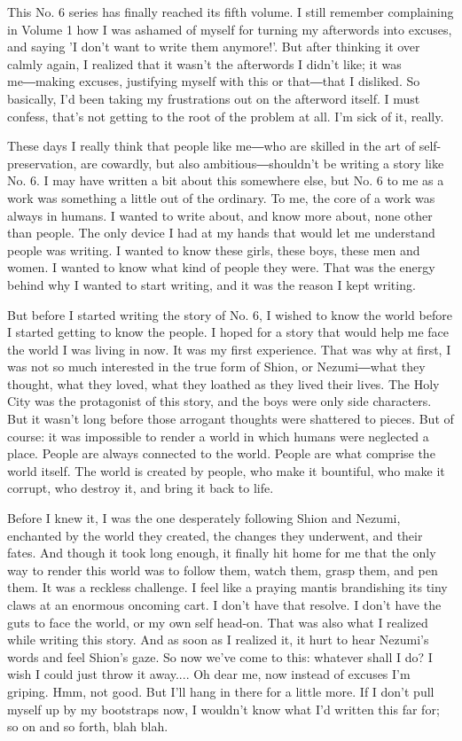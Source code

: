 This No. 6 series has finally reached its fifth volume. I still remember
complaining in Volume 1 how I was ashamed of myself for turning my
afterwords into excuses, and saying 'I don't want to write them
anymore!'. But after thinking it over calmly again, I realized that it
wasn't the afterwords I didn't like; it was me―making excuses,
justifying myself with this or that―that I disliked. So basically, I'd
been taking my frustrations out on the afterword itself. I must confess,
that's not getting to the root of the problem at all. I'm sick of it,
really.

These days I really think that people like me―who are skilled in the art
of self-preservation, are cowardly, but also ambitious―shouldn't be
writing a story like No. 6. I may have written a bit about this
somewhere else, but No. 6 to me as a work was something a little out of
the ordinary. To me, the core of a work was always in humans. I wanted
to write about, and know more about, none other than people. The only
device I had at my hands that would let me understand people was
writing. I wanted to know these girls, these boys, these men and women.
I wanted to know what kind of people they were. That was the energy
behind why I wanted to start writing, and it was the reason I kept
writing.

But before I started writing the story of No. 6, I wished to know the
world before I started getting to know the people. I hoped for a story
that would help me face the world I was living in now. It was my first
experience. That was why at first, I was not so much interested in the
true form of Shion, or Nezumi―what they thought, what they loved, what
they loathed as they lived their lives. The Holy City was the
protagonist of this story, and the boys were only side characters. But
it wasn't long before those arrogant thoughts were shattered to pieces.
But of course: it was impossible to render a world in which humans were
neglected a place. People are always connected to the world. People are
what comprise the world itself. The world is created by people, who make
it bountiful, who make it corrupt, who destroy it, and bring it back to
life.

Before I knew it, I was the one desperately following Shion and Nezumi,
enchanted by the world they created, the changes they underwent, and
their fates. And though it took long enough, it finally hit home for me
that the only way to render this world was to follow them, watch them,
grasp them, and pen them. It was a reckless challenge. I feel like a
praying mantis brandishing its tiny claws at an enormous oncoming cart.
I don't have that resolve. I don't have the guts to face the world, or
my own self head-on. That was also what I realized while writing this
story. And as soon as I realized it, it hurt to hear Nezumi's words and
feel Shion's gaze. So now we've come to this: whatever shall I do? I
wish I could just throw it away.... Oh dear me, now instead of excuses
I'm griping. Hmm, not good. But I'll hang in there for a little more. If
I don't pull myself up by my bootstraps now, I wouldn't know what I'd
written this far for; so on and so forth, blah blah.

